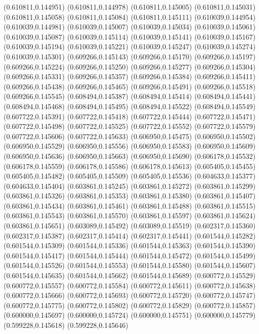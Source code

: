 (0.610811,0.144951)
(0.610811,0.144978)
(0.610811,0.145005)
(0.610811,0.145031)
(0.610811,0.145058)
(0.610811,0.145084)
(0.610811,0.145111)
(0.610039,0.144954)
(0.610039,0.144981)
(0.610039,0.145007)
(0.610039,0.145034)
(0.610039,0.145061)
(0.610039,0.145087)
(0.610039,0.145114)
(0.610039,0.145141)
(0.610039,0.145167)
(0.610039,0.145194)
(0.610039,0.145221)
(0.610039,0.145247)
(0.610039,0.145274)
(0.610039,0.145301)
(0.609266,0.145143)
(0.609266,0.145170)
(0.609266,0.145197)
(0.609266,0.145224)
(0.609266,0.145250)
(0.609266,0.145277)
(0.609266,0.145304)
(0.609266,0.145331)
(0.609266,0.145357)
(0.609266,0.145384)
(0.609266,0.145411)
(0.609266,0.145438)
(0.609266,0.145465)
(0.609266,0.145491)
(0.609266,0.145518)
(0.609266,0.145545)
(0.608494,0.145387)
(0.608494,0.145414)
(0.608494,0.145441)
(0.608494,0.145468)
(0.608494,0.145495)
(0.608494,0.145522)
(0.608494,0.145549)
(0.607722,0.145391)
(0.607722,0.145418)
(0.607722,0.145444)
(0.607722,0.145471)
(0.607722,0.145498)
(0.607722,0.145525)
(0.607722,0.145552)
(0.607722,0.145579)
(0.607722,0.145606)
(0.607722,0.145633)
(0.606950,0.145475)
(0.606950,0.145502)
(0.606950,0.145529)
(0.606950,0.145556)
(0.606950,0.145583)
(0.606950,0.145609)
(0.606950,0.145636)
(0.606950,0.145663)
(0.606950,0.145690)
(0.606178,0.145532)
(0.606178,0.145559)
(0.606178,0.145586)
(0.606178,0.145613)
(0.605405,0.145455)
(0.605405,0.145482)
(0.605405,0.145509)
(0.605405,0.145536)
(0.604633,0.145377)
(0.604633,0.145404)
(0.603861,0.145245)
(0.603861,0.145272)
(0.603861,0.145299)
(0.603861,0.145326)
(0.603861,0.145353)
(0.603861,0.145380)
(0.603861,0.145407)
(0.603861,0.145434)
(0.603861,0.145461)
(0.603861,0.145488)
(0.603861,0.145515)
(0.603861,0.145543)
(0.603861,0.145570)
(0.603861,0.145597)
(0.603861,0.145624)
(0.603861,0.145651)
(0.603089,0.145492)
(0.603089,0.145519)
(0.602317,0.145360)
(0.602317,0.145387)
(0.602317,0.145414)
(0.602317,0.145441)
(0.601544,0.145282)
(0.601544,0.145309)
(0.601544,0.145336)
(0.601544,0.145363)
(0.601544,0.145390)
(0.601544,0.145417)
(0.601544,0.145444)
(0.601544,0.145472)
(0.601544,0.145499)
(0.601544,0.145526)
(0.601544,0.145553)
(0.601544,0.145580)
(0.601544,0.145607)
(0.601544,0.145635)
(0.601544,0.145662)
(0.601544,0.145689)
(0.600772,0.145529)
(0.600772,0.145557)
(0.600772,0.145584)
(0.600772,0.145611)
(0.600772,0.145638)
(0.600772,0.145666)
(0.600772,0.145693)
(0.600772,0.145720)
(0.600772,0.145747)
(0.600772,0.145775)
(0.600772,0.145802)
(0.600772,0.145829)
(0.600772,0.145857)
(0.600000,0.145697)
(0.600000,0.145724)
(0.600000,0.145751)
(0.600000,0.145779)
(0.599228,0.145618)
(0.599228,0.145646)
